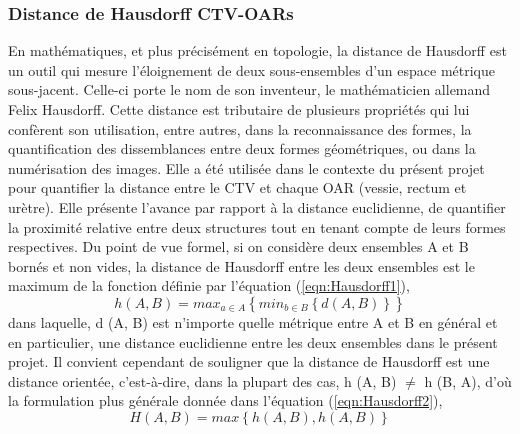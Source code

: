 \subsubsection{Distance de Hausdorff CTV-OARs}
En mathématiques, et plus précisément en topologie, la distance de Hausdorff est un outil qui mesure l’éloignement de deux sous-ensembles d’un espace métrique sous-jacent. Celle-ci porte le nom de son inventeur, le mathématicien allemand Felix Hausdorff. Cette distance est tributaire de plusieurs propriétés qui lui confèrent son utilisation, entre autres, dans la reconnaissance des formes, la quantification des dissemblances entre deux formes géométriques, ou dans la numérisation des images. Elle a été utilisée dans le contexte du présent projet pour quantifier la distance entre le CTV et chaque OAR (vessie, rectum et urètre). Elle présente l’avance par rapport à la distance euclidienne, de quantifier la proximité relative entre deux structures tout en tenant compte de leurs formes respectives. Du point de vue formel, si on considère deux ensembles A et B bornés et non vides, la distance de Hausdorff entre les deux ensembles est le maximum de la fonction définie par l’équation (\ref{eqn:Hausdorff1}),
%
\begin{equation}\label{eqn:Hausdorff1}
	h (A, B) = max_{a\in A}\left\{min_{b\in B}\left\{d (A, B)\right\}\right\}
\end{equation}
%
dans laquelle, d (A, B) est n’importe quelle métrique entre A et B en général et en particulier, une distance euclidienne entre les deux ensembles dans le présent projet. Il convient cependant de souligner que la distance de Hausdorff est une distance orientée, c’est-à-dire, dans la plupart des cas, h (A, B) $\neq$ h (B, A), d’où la formulation plus générale donnée dans l’équation (\ref{eqn:Hausdorff2}),
%
\begin{equation}\label{eqn:Hausdorff2}
	H (A, B) = max\left\{h (A, B), h (A, B)\right\}
\end{equation}
%
